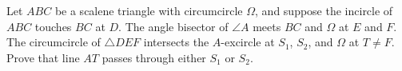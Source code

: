 Let $ABC$ be a scalene triangle with circumcircle $\Omega$, and suppose the incircle of $ABC$ touches $BC$ at $D$. The angle bisector of $\angle A$ meets $BC$ and $\Omega$ at $E$ and $F$.  The circumcircle of $\triangle DEF$ intersects the $A$-excircle at $S_1$, $S_2$, and $\Omega$ at $T \neq F$. Prove that line $AT$ passes through either $S_1$ or $S_2$.